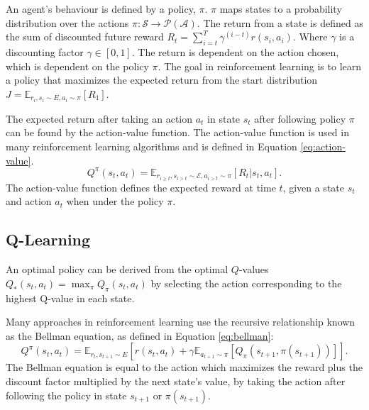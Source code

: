An agent's behaviour is defined by a policy, $\pi$. $\pi$ maps states to a probability distribution over the actions $\pi:\mathcal{S}\rightarrow \mathcal{P}(\mathcal{A})$. The return from a state is defined as the sum of discounted future reward $R_t=\sum_{i=t}^T\gamma^{(i-t)}r(s_i,a_i)$. Where $\gamma$ is a discounting factor $\gamma \in [0,1]$. The return is dependent on the action chosen, which is dependent on the policy $\pi$. The goal in reinforcement learning is to learn a policy that maximizes the expected return from the start distribution $J=\mathbb{E}_{r_i,s_i \sim E,a_i \sim \pi}[R_1]$. 

The expected return after taking an action $a_t$ in state $s_t$ after following policy $\pi$ can be found by the action-value function. The action-value function is used in many reinforcement learning algorithms and is defined in Equation \ref{eq:action-value}.
\begin{equation}
\label{eq:action-value}
Q^{\pi}(s_t,a_t)=\mathbb{E}_{r_{i\geq t},s_{i>t}\sim \mathcal{E},a_{i>t}\sim\pi}[R_t|s_t,a_t].
\end{equation}
\noindent The action-value function defines the expected reward at time $t$, given a state $s_t$ and action $a_t$ when under the policy $\pi$.

\subsection{Q-Learning}

An optimal policy can be derived from the optimal $Q$-values $Q_*(s_t,a_t)=\max_\pi Q_\pi(s_t,a_t)$ by selecting the action corresponding to the highest Q-value in each state.

Many approaches in reinforcement learning use the recursive relationship known as the Bellman equation, as defined in Equation \ref{eq:bellman}:
\begin{dmath}
	\label{eq:bellman}
	Q^\pi(s_t,a_t)=\mathbb{E}_{{r_t},s_{t+1}\sim E} [r(s_t,a_t)+
	\gamma\mathbb{E}_{a_{t+1}\sim \pi}[Q_\pi(s_{t+1},\pi(s_{t+1}))]].
\end{dmath}
\noindent The Bellman equation is equal to the action which maximizes the reward plus the discount factor multiplied by the next state's value, by taking the action after following the policy in state $s_{t+1}$ or $\pi(s_{t+1})$.

